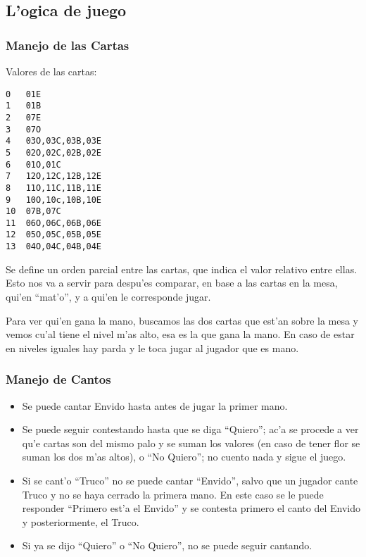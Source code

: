 \subsection{L'ogica de juego}

\subsubsection{Manejo de las Cartas}

Valores de las cartas:
\begin{verbatim}
0   01E
1   01B
2   07E
3   07O
4   03O,03C,03B,03E
5   02O,02C,02B,02E
6   01O,01C
7   12O,12C,12B,12E
8   11O,11C,11B,11E
9   10O,10c,10B,10E
10  07B,07C
11  06O,06C,06B,06E
12  05O,05C,05B,05E
13  04O,04C,04B,04E
\end{verbatim}

Se define un orden parcial entre las cartas, que indica el valor relativo entre ellas. Esto nos va a servir para despu'es comparar, en base a las cartas en la mesa, qui'en ``mat'o'', y a qui'en le corresponde jugar.

Para ver qui'en gana la mano, buscamos las dos cartas que est'an sobre la mesa y vemos cu'al tiene el nivel m'as alto, esa es la que gana la mano. En caso de estar en niveles iguales hay parda y le toca jugar al jugador que es mano.


\subsubsection{Manejo de Cantos}

\begin{itemize}
\item Se puede cantar Envido hasta antes de jugar la primer mano.
\item Se puede seguir contestando hasta que se diga ``Quiero''; ac'a se procede a ver qu'e cartas son del mismo palo y se suman los valores (en caso de tener flor se suman los dos m'as altos), o ``No Quiero''; no cuento nada y sigue el juego.
\item Si se cant'o ``Truco'' no se puede cantar ``Envido'', salvo que un jugador cante Truco y no se haya cerrado la primera mano. En este caso se le puede responder ``Primero est'a el Envido'' y se contesta primero el canto del Envido y posteriormente, el Truco.
\item Si ya se dijo ``Quiero'' o ``No Quiero'', no se puede seguir cantando.
\end{itemize}


